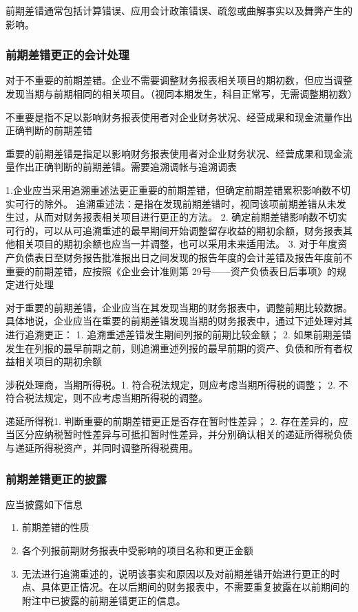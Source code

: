 \documentclass[UTF8,12pt]{ctexart}
\numberwithin{equation}{section} %
\numberwithin{figure}{section}
\numberwithin{table}{section}
\begin{document}
	前期差错通常包括计算错误、应用会计政策错误、疏忽或曲解事实以及舞弊产生的影响。
	\subsubsection{前期差错更正的会计处理}
	对于不重要的前期差错。企业不需要调整财务报表相关项目的期初数，但应当调整发现当期与前期相同的相关项目。（视同本期发生，科目正常写，无需调整期初数）
	
	不重要是指不足以影响财务报表使用者对企业财务状况、经营成果和现金流量作出正确判断的前期差错
	
	重要的前期差错是指足以影响财务报表使用者对企业财务状况、经营成果和现金流量作出正确判断的前期差错。需要追溯调帐与追溯调表
	
	1.企业应当采用追溯重述法更正重要的前期差错，但确定前期差错累积影响数不切实可行的除外。
	追溯重述法：是指在发现前期差错时，视同该项前期差错从未发生过，从而对财务报表相关项目进行更正的方法。
	2.	确定前期差错影响数不切实可行的，可以从可追溯重述的最早期间开始调整留存收益的期初余额，财务报表其他相关项目的期初余额也应当一并调整，也可以采用未来适用法。
	3.	对于年度资产负债表日至财务报告批准报出日之间发现的报告年度的会计差错及报告年度前不重要的前期差错，应按照《企业会计准则第 29号——资产负债表日后事项》的规定进行处理
	
	对于重要的前期差错，企业应当在其发现当期的财务报表中，调整前期比较数据。具体地说，企业应当在重要的前期差错发现当期的财务报表中，通过下述处理对其进行追溯更正：
	1.	追溯重述差错发生期间列报的前期比较金额；
	2.	如果前期差错发生在列报的最早前期之前，则追溯重述列报的最早前期的资产、负债和所有者权益相关项目的期初余额
	
	涉税处理商，当期所得税。1.	符合税法规定，则应考虑当期所得税的调整；
	2.	不符合税法规定，则不应考虑当期所得税的调整。
	
	递延所得税1.	判断重要的前期差错更正是否存在暂时性差异；
	2.	存在差异的，应当区分应纳税暂时性差异与可抵扣暂时性差异，并分别确认相关的递延所得税负债与递延所得税资产，并同时调整所得税费用。
	
	
	\subsubsection{前期差错更正的披露}
	应当披露如下信息
	\begin{enumerate}
		\item 前期差错的性质
		
		\item 各个列报前期财务报表中受影响的项目名称和更正金额
		
		\item 无法进行追溯重述的，说明该事实和原因以及对前期差错开始进行更正的时点、具体更正情况。在以后期间的财务报表中，不需要重复披露在以前期间的附注中已披露的前期差错更正的信息。
	\end{enumerate}
	
\end{document}

